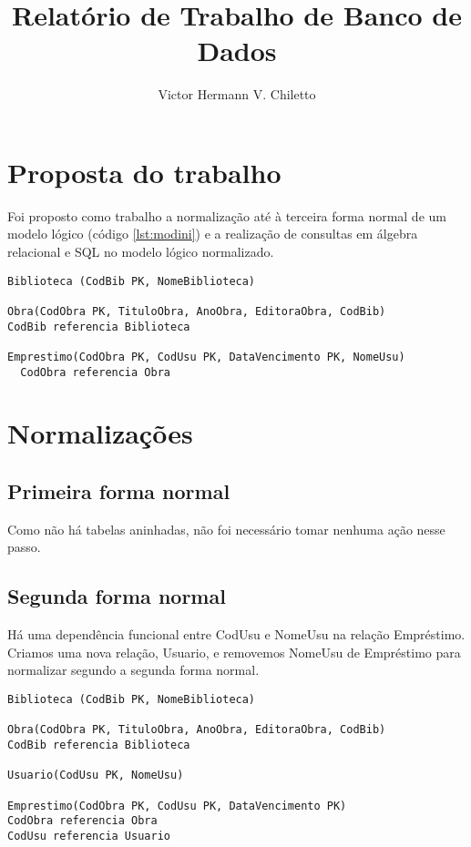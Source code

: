 \documentclass[12pt]{article}
\title{Relatório de Trabalho de Banco de Dados}
\author{Victor Hermann V. Chiletto}
\begin{document}
 

\maketitle

\section{Proposta do trabalho}

Foi proposto como trabalho a normalização até à terceira forma normal de um modelo lógico (código \ref{lst:modini}) e a realização de consultas em álgebra relacional e SQL no modelo lógico normalizado.

\begin{lstlisting}[caption=Modelo lógico inicial, label={lst:modini}]
Biblioteca (CodBib PK, NomeBiblioteca)

Obra(CodObra PK, TituloObra, AnoObra, EditoraObra, CodBib)
CodBib referencia Biblioteca

Emprestimo(CodObra PK, CodUsu PK, DataVencimento PK, NomeUsu)
  CodObra referencia Obra
\end{lstlisting}

\section{Normalizações}
  \subsection{Primeira forma normal}
    Como não há tabelas aninhadas, não foi necessário tomar nenhuma ação nesse passo.

  \subsection{Segunda forma normal}
    Há uma dependência funcional entre CodUsu e NomeUsu na relação Empréstimo. Criamos uma nova relação, Usuario, e removemos NomeUsu de Empréstimo para normalizar segundo a segunda forma normal.

    \begin{lstlisting}[caption=Modelo lógico na segunda forma normal, label={lst:mod2fn}]
Biblioteca (CodBib PK, NomeBiblioteca)

Obra(CodObra PK, TituloObra, AnoObra, EditoraObra, CodBib)
CodBib referencia Biblioteca

Usuario(CodUsu PK, NomeUsu)

Emprestimo(CodObra PK, CodUsu PK, DataVencimento PK)
CodObra referencia Obra
CodUsu referencia Usuario
    \end{lstlisting}
  
\end{document}
